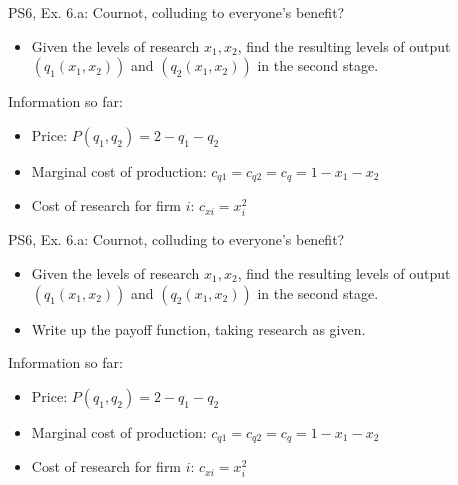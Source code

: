 \begin{frame}{PS6, Ex. 6.a: Cournot, colluding to everyone's benefit?}
    \begin{itemize}
    \item[(a)] Given the levels of research $x_1,x_2$, find the resulting levels of output $(q_1(x_1, x_2))$ and $(q_2(x_1, x_2))$ in the second stage.
    \end{itemize}
  \begin{multicols}{2}
    \vfill\null \columnbreak
    Information so far:
    \begin{itemize}
      \item[1] Price: $P(q_1,q_2)=2-q_1-q_2$
      \item[2] Marginal cost of production: $c_{q1} = c_{q2} = c_q =1 - x_1 - x_2$
      \item[3] Cost of research for firm $i$: $c_{xi}=x_i^2$
    \end{itemize}
    \vfill\null
  \end{multicols}
\end{frame}
\begin{frame}{PS6, Ex. 6.a: Cournot, colluding to everyone's benefit?}
    \begin{itemize}
    \item[(a)] Given the levels of research $x_1,x_2$, find the resulting levels of output $(q_1(x_1, x_2))$ and $(q_2(x_1, x_2))$ in the second stage.
    \end{itemize}
  \begin{multicols}{2}
    \begin{itemize}
      \item[(Step 1)] Write up the payoff function, taking research as given.
    \end{itemize}
    \vfill\null \columnbreak
    Information so far:
    \begin{itemize}
      \item[1] Price: $P(q_1,q_2)=2-q_1-q_2$
      \item[2] Marginal cost of production: $c_{q1} = c_{q2} = c_q =1 - x_1 - x_2$
      \item[3] Cost of research for firm $i$: $c_{xi}=x_i^2$
    \end{itemize}
    \vfill\null
  \end{multicols}
\end{frame}
